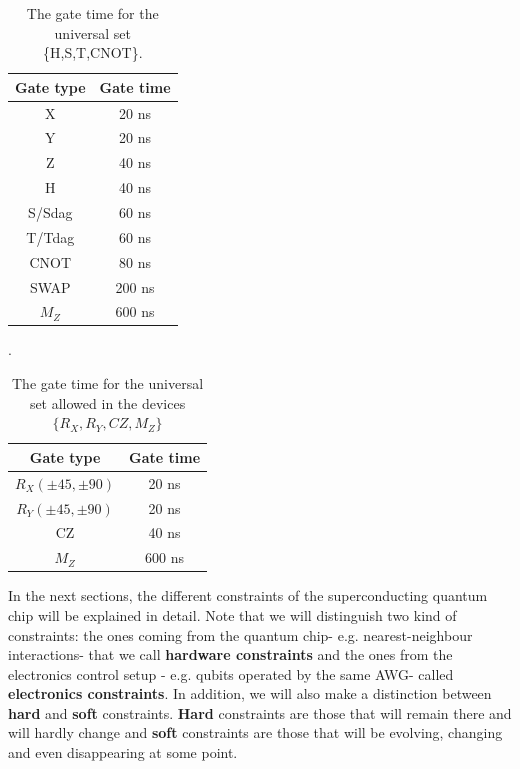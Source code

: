 \begin{table}[bth!]
\centering
\caption{The gate time for the universal set \{H,S,T,CNOT\}.} 
\label{uni_set_gatetime}
\begin{tabular}{c|c}
\hline
Gate type & Gate time \\ \hline
X         & 20 ns     \\ 
Y         & 20 ns     \\ 
Z         & 40 ns     \\ 
H         & 40 ns     \\ 
S/Sdag    & 60 ns          \\ 
T/Tdag    & 60 ns          \\ 
CNOT      & 80 ns     \\ 
SWAP      & 200 ns    \\ 
$M_{Z}$         &  600 ns          \\ \hline
\end{tabular}
\end{table}

\begin{table}[bth!]
\centering
\caption{The gate time for the universal set allowed in the devices $\{R_{X},R_{Y},CZ,M_{Z}\}$}.
\label{sc_set_gatetime}
\begin{tabular}{c|c}
\hline
Gate type & Gate time \\ \hline
$R_{X}(\pm 45, \pm90)$         & 20 ns     \\ 
$R_{Y}(\pm 45, \pm90)$       & 20 ns     \\ 
CZ        & 40 ns     \\ 
$M_{Z}$         &  600 ns          \\ \hline
\end{tabular}
\end{table}

In the next sections, the different constraints of the superconducting quantum chip will be explained in detail. Note that we will distinguish two kind of constraints: the ones coming from the quantum chip- e.g. nearest-neighbour interactions- that we call \textbf{hardware constraints} and the ones from the electronics control setup - e.g. qubits operated by the same AWG- called \textbf{electronics constraints}. In addition, we will also make a distinction between \textbf{hard} and \textbf{soft} constraints. \textbf{Hard} constraints are those that will remain there and will hardly change and \textbf{soft} constraints are those that will be evolving, changing and even disappearing at some point. 






